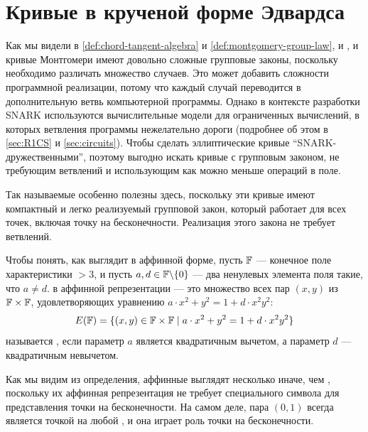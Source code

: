 \section{Кривые в крученой форме Эдвардса}\label{sec:edwards}
Как мы видели в  \ref{def:chord-tangent-algebra} и  \ref{def:montgomery-group-law}, и , и кривые Монтгомери имеют довольно сложные групповые законы, поскольку необходимо различать множество случаев. Это может добавить сложности программной реализации, потому что каждый случай переводится в дополнительную ветвь компьютерной программы. Однако в контексте разработки SNARK используются вычислительные модели для ограниченных вычислений, в которых ветвления программы нежелательно дороги (подробнее об этом в \secname{} \ref{sec:R1CS} и \ref{sec:circuits}). Чтобы сделать эллиптические кривые ``SNARK-дружественными'', поэтому выгодно искать кривые с групповым законом, не требующим ветвлений и использующим как можно меньше операций в поле.

Так называемые  особенно полезны здесь, поскольку эти кривые имеют компактный и легко реализуемый групповой закон, который работает для всех точек, включая точку на бесконечности. Реализация этого закона не требует ветвлений. 

Чтобы понять, как выглядит  в аффинной форме, пусть $\mathbb{F}$ — конечное поле характеристики $>3$, и пусть $a,d\in \mathbb{F}\backslash\{0\}$ — два ненулевых элемента поля такие, что $a\neq d$.  в аффинной репрезентации — это множество всех пар $(x,y)$ из $\mathbb{F}\times \mathbb{F}$, удовлетворяющих уравнению  $a\cdot x^2+y^2= 1+d\cdot x^2y^2$:
\begin{equation}\label{eq:twisted-edwards}
E(\mathbb{F})=\{(x,y)\in\mathbb{F}\times\mathbb{F}\;|\; a\cdot x^2+y^2= 1+d\cdot x^2y^2\}
\end{equation} 
 называется , если параметр $a$ является квадратичным вычетом, а параметр $d$ — квадратичным невычетом.

Как мы видим из определения, аффинные  выглядят несколько иначе, чем , поскольку их аффинная репрезентация не требует специального символа для представления точки на бесконечности. На самом деле, пара $(0,1)$ всегда является точкой на любой , и она играет роль точки на бесконечности.

